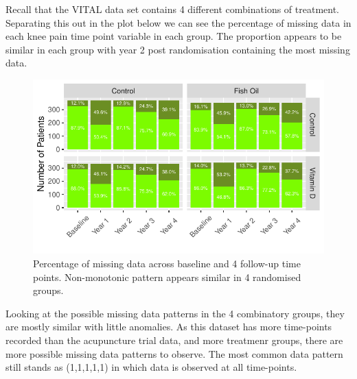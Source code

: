 \documentclass{article}
\begin{document}
Recall that the VITAL data set contains 4 different combinations of
treatment. Separating this out in the plot below we can see the
percentage of missing data in each knee pain time point variable in each
group. The proportion appears to be similar in each group with year 2
post randomisation containing the most missing data.

\begin{figure}

{\centering \includegraphics{Final_Report_files/figure-latex/unnamed-chunk-22-1} 

}

\caption{Percentage of missing data across baseline and 4 follow-up time points. Non-monotonic pattern appears similar in 4 randomised groups.}\label{fig:unnamed-chunk-22}
\end{figure}

Looking at the possible missing data patterns in the 4 combinatory
groups, they are mostly similar with little anomalies. As this dataset
has more time-points recorded than the acupuncture trial data, and more
treatmenr groups, there are more possible missing data patterns to
observe. The most common data pattern still stands as (1,1,1,1,1) in
which data is observed at all time-points.
\end{document}

